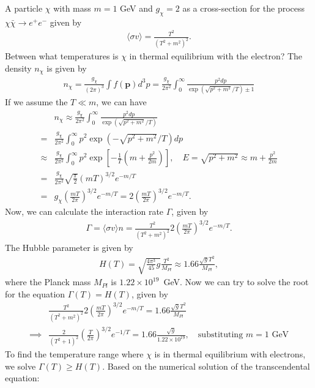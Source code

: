 \clearpage
{}
A particle $\chi$ with mass $m=1$ GeV and $g_\chi=2$ as a cross-section for the process $\chi\bar{\chi}\to e^+e^-$ given by
\begin{align}
    \langle \sigma v\rangle =\frac{T^2}{(T^2+m^2)^2}.
\end{align}
Between what temperatures is $\chi$ in thermal equilibrium with the electron? 
\answer{}
The density $n_\chi$ is given by
\begin{align}
    n_\chi = \frac{g_\chi}{(2\pi)^3} \int f(\mathbf{p})d^3p=\frac{g_\chi}{2\pi^2}\int_0^\infty \frac{p^2 dp}{\exp(\sqrt{p^2+m^2}/T)\pm1} 
\end{align}
If we assume the $T\ll m$, we can have 
\begin{align}
    &n_\chi\approx\frac{g_\chi}{2\pi^2}\int_0^\infty \frac{p^2 dp}{\exp(\sqrt{p^2+m^2}/T)}\\
    =&\frac{g_\chi}{2\pi^2}\int_0^\infty p^2 \exp(-\sqrt{p^2+m^2}/T) dp\\
    \approx& \frac{g_\chi}{2\pi^2}\int_0^\infty p^2 \exp{\left[-\frac{1}{T}\left(m+\frac{p^2}{2m}\right)\right]}, \quad \text{$E=\sqrt{p^2+m^2}\approx m + \frac{p^2}{2m}$}\\
    =&\frac{g_\chi}{2\pi^2} \sqrt{\frac{\pi}{2}} \left(mT\right)^{3/2} e^{-m/T}\\
    =&g_\chi\left(\frac{mT}{2\pi}\right)^{3/2} e^{-m/T}=2\left(\frac{mT}{2\pi}\right)^{3/2} e^{-m/T}.
\end{align}
Now, we can calculate the interaction rate $\Gamma$, given by 
\begin{align}
    \Gamma= \langle\sigma v \rangle n = \frac{T^2}{(T^2+m^2)^2} 2\left(\frac{mT}{2\pi}\right)^{3/2} e^{-m/T}.
\end{align}
The Hubble parameter is given by 
\begin{align}
    H(T) = \sqrt{\frac{4\pi^3}{45}g} \frac{T^2}{M_{Pl}}\approx1.66\frac{\sqrt{g}T^2}{M_{Pl}},
\end{align}
where the Planck mass $M_{Pl}$ is $1.22\times10^{19}$~GeV. Now we can try to solve the root for the equation $\Gamma(T)=H(T)$, given by 
\begin{align}
    &\frac{T^2}{(T^2+m^2)^2} 2\left(\frac{mT}{2\pi}\right)^{3/2} e^{-m/T} = 1.66\frac{\sqrt{g}T^2}{M_{Pl}}\\
    \implies&\frac{2}{(T^2+1)^2}\left(\frac{T}{2\pi}\right)^{3/2} e^{-1/T} = 1.66\frac{\sqrt{g}}{1.22\times10^{19}},\quad\text{substituting $m = 1$~GeV}
\end{align}
To find the temperature range where $\chi$ is in thermal equilibrium with electrons, we solve $\Gamma(T) \ge H(T)$. Based on the numerical solution of the transcendental equation: 
